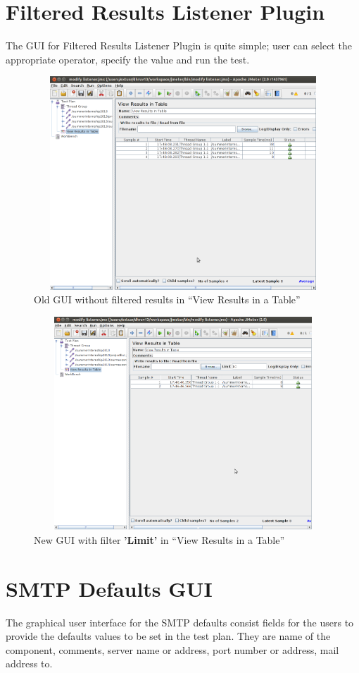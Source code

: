 \documentclass[12pt]{book}
\begin{document}
 \section{Filtered Results Listener Plugin}
 The GUI for Filtered Results Listener Plugin is quite simple; user can select the appropriate operator, specify the value and run the test.
 
  \begin{figure}[H]
   \centering
   \includegraphics[width=14cm, height=8cm]{images/filteredresults_1}
   \caption{Old GUI without filtered results in ``View Results in a Table''\label{fig:fig16_JMeter}}
  \end{figure}
  
  \begin{figure}[H]
   \centering
   \includegraphics[width=14cm, height=8cm]{images/filteredresults_2}
   \caption{New GUI with filter \textbf{'Limit'} in ``View Results in a Table''\label{fig:fig17_JMeter}}
  \end{figure}
  
 \section{SMTP Defaults GUI}
 The graphical user interface for the SMTP defaults consist fields for the users to provide the
defaults values to be set in the test plan. They are name of the component, comments, server
name or address, port number or address, mail address to.
\end{document}
